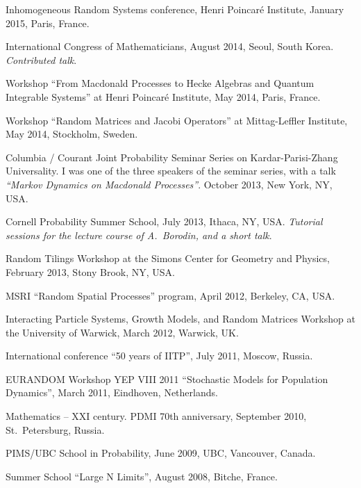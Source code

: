 \documentclass[letterpaper,11pt]{article}
\begin{document}
\begin{etaremune}
	\item
	      Inhomogeneous Random Systems conference, Henri Poincar\'e
	      Institute, January 2015, Paris, France.

	\item
	      International Congress of Mathematicians, August 2014, Seoul,
	      South Korea. \emph{Contributed talk}.

	\item
	      Workshop ``From Macdonald Processes to Hecke Algebras and
	      Quantum Integrable Systems'' at Henri Poincar\'e Institute, May 2014, Paris,
	      France.

	\item
	      Workshop ``Random Matrices and Jacobi Operators'' at
	      Mittag-Leffler Institute, May 2014, Stockholm, Sweden.

	\item
	      Columbia / Courant Joint Probability Seminar Series on
	      Kardar-Parisi-Zhang Universality. I was one of the three speakers of the
	      seminar series, with a talk \emph{``Markov Dynamics on Macdonald Processes''}.
	      October 2013, New York, NY, USA.

	\item
	      Cornell Probability Summer School, July 2013, Ithaca, NY, USA.
	      \emph{Tutorial sessions for the lecture course of A.~Borodin, and a short
		      talk}.

	\item
	      Random Tilings Workshop at the Simons Center for Geometry and
	      Physics, February 2013, Stony Brook, NY, USA.

	\item
	      MSRI ``Random Spatial Processes'' program, April 2012, Berkeley,
	      CA, USA.

	\item
	      Interacting Particle Systems, Growth Models, and Random Matrices
	      Workshop at the University of Warwick, March 2012, Warwick, UK.

	\item
	      International conference ``50 years of IITP'', July 2011,
	      Moscow, Russia.

	\item
	      EURANDOM Workshop YEP VIII 2011 ``Stochastic Models for
	      Population Dynamics'', March 2011, Eindhoven, Netherlands.

	\item
	      Mathematics -- XXI century. PDMI 70th anniversary, September
	      2010, St.~Petersburg, Russia.

	\item
	      PIMS/UBC School in Probability, June 2009, UBC, Vancouver,
	      Canada.

	\item
	      Summer School ``Large N Limits'', August 2008, Bitche, France.
\end{etaremune}
\end{document}
